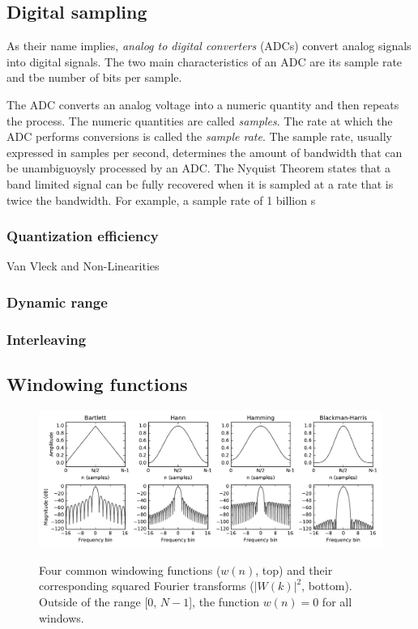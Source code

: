 \documentclass{ws-rv961x669}
\begin{document}
\subsection{Digital sampling}

As their name implies, \emph{analog to digital converters} (ADCs) convert analog signals into digital signals. The two main characteristics of an ADC are its sample rate and tbe number of bits per sample.

The ADC converts an analog voltage into a numeric quantity and then repeats the process. The numeric quantities are called \emph{samples}. The rate at which the ADC performs conversions is called the \emph{sample rate}. The sample rate, usually expressed in samples per second, determines the amount of bandwidth that can be unambiguoysly processed by an ADC. The Nyquist Theorem states that a band limited signal can be fully recovered when it is sampled at a rate that is twice the bandwidth. For example, a sample rate of 1 billion s

\subsubsection{Quantization efficiency}

Van Vleck and Non-Linearities

\subsubsection{Dynamic range}

\subsubsection{Interleaving}

\subsection{Windowing functions}

\begin{figure}
 \centering
 \includegraphics[width=\textwidth]{./figures/window_fns}
 \label{fig:window_fns}
 \caption{Four common windowing functions ($w(n)$, top) and their corresponding squared Fourier transforms ($|W(k)|^2$, bottom). Outside of the range [0, $N-1$], the function $w(n)=0$ for all windows.}
\end{figure}
\end{document}
